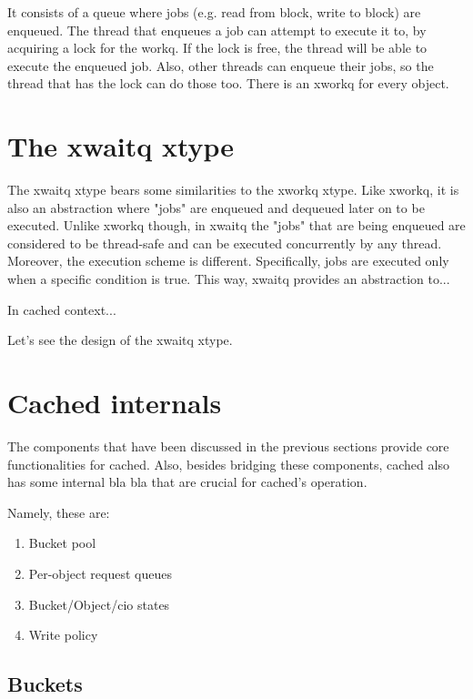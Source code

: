 
It consists of a queue where jobs (e.g.  read from block, write to block) are 
enqueued. The thread that enqueues a job can attempt to execute it to, by 
acquiring a lock for the workq. If the lock is free, the thread will be able to 
execute the enqueued job. Also, other threads can enqueue their jobs, so the 
thread that has the lock can do those too. There is an xworkq for every object.


\section{The xwaitq xtype}\label{sec:xwaitq-design}

The xwaitq xtype bears some similarities to the xworkq xtype. Like xworkq, it is 
also an abstraction where "jobs" are enqueued and dequeued later on to be 
executed. Unlike xworkq though, in xwaitq the "jobs" that are being enqueued are 
considered to be thread-safe and can be executed concurrently by any thread.  
Moreover, the execution scheme is different. Specifically, jobs are executed 
only when a specific condition is true. This way, xwaitq provides an abstraction 
to...

In cached context...

Let's see the design of the xwaitq xtype. 


\section{Cached internals}\label{sec:cached-design}

The components that have been discussed in the previous sections provide core 
functionalities for cached. Also, besides bridging these components, cached also 
has some internal bla bla that are crucial for cached's operation.

Namely, these are:

\begin{enumerate}
	\item Bucket pool
	\item Per-object request queues
	\item Bucket/Object/cio states
	\item Write policy
\end{enumerate}

\subsection{Buckets}

